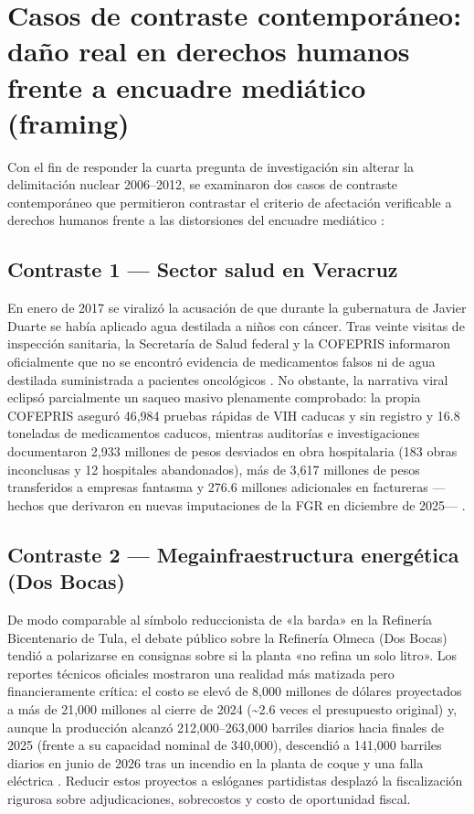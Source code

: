 \section{Casos de contraste contemporáneo: daño real en derechos humanos frente a encuadre mediático (framing)}

Con el fin de responder la cuarta pregunta de investigación sin alterar la delimitación nuclear 2006--2012, se examinaron dos casos de contraste contemporáneo que permitieron contrastar el criterio de afectación verificable a derechos humanos \citep{cidh2019,acnudh} frente a las distorsiones del encuadre mediático \citep{solamorales2019}:

\subsection{Contraste 1 --- Sector salud en Veracruz}

En enero de 2017 se viralizó la acusación de que durante la gubernatura de Javier Duarte se había aplicado agua destilada a niños con cáncer. Tras veinte visitas de inspección sanitaria, la Secretaría de Salud federal y la COFEPRIS informaron oficialmente que no se encontró evidencia de medicamentos falsos ni de agua destilada suministrada a pacientes oncológicos \citep{cofepris2017}. No obstante, la narrativa viral eclipsó parcialmente un saqueo masivo plenamente comprobado: la propia COFEPRIS aseguró 46,984 pruebas rápidas de VIH caducas y sin registro y 16.8 toneladas de medicamentos caducos, mientras auditorías e investigaciones documentaron 2,933 millones de pesos desviados en obra hospitalaria (183 obras inconclusas y 12 hospitales abandonados), más de 3,617 millones de pesos transferidos a empresas fantasma y 276.6 millones adicionales en factureras ---hechos que derivaron en nuevas imputaciones de la FGR en diciembre de 2025--- \citep{connectas,animalpolitico,santiago2025,angel2025}.

\subsection{Contraste 2 --- Megainfraestructura energética (Dos Bocas)}

De modo comparable al símbolo reduccionista de «la barda» en la Refinería Bicentenario de Tula, el debate público sobre la Refinería Olmeca (Dos Bocas) tendió a polarizarse en consignas sobre si la planta «no refina un solo litro». Los reportes técnicos oficiales mostraron una realidad más matizada pero financieramente crítica: el costo se elevó de 8,000 millones de dólares proyectados a más de 21,000 millones al cierre de 2024 (\textasciitilde2.6 veces el presupuesto original) y, aunque la producción alcanzó 212,000--263,000 barriles diarios hacia finales de 2025 (frente a su capacidad nominal de 340,000), descendió a 141,000 barriles diarios en junio de 2026 tras un incendio en la planta de coque y una falla eléctrica \citep{alegria2026,martinezescamilla2026,celaya2026}. Reducir estos proyectos a eslóganes partidistas desplazó la fiscalización rigurosa sobre adjudicaciones, sobrecostos y costo de oportunidad fiscal.

